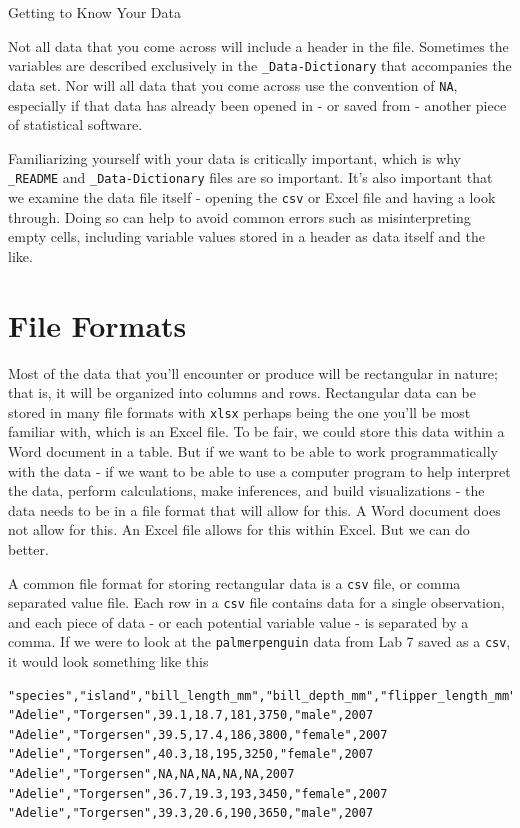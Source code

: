 \documentclass[
]{book}
\begin{document}
Getting to Know Your Data

Not all data that you come across will include a header in the file. Sometimes the variables are described exclusively in the \texttt{\_Data-Dictionary} that accompanies the data set. Nor will all data that you come across use the convention of \texttt{NA}, especially if that data has already been opened in - or saved from - another piece of statistical software.

Familiarizing yourself with your data is critically important, which is why \texttt{\_README} and \texttt{\_Data-Dictionary} files are so important. It's also important that we examine the data file itself - opening the \texttt{csv} or Excel file and having a look through. Doing so can help to avoid common errors such as misinterpreting empty cells, including variable values stored in a header as data itself and the like.

\hypertarget{file-formats}{%
\section*{File Formats}\label{file-formats}}

Most of the data that you'll encounter or produce will be rectangular in nature; that is, it will be organized into columns and rows. Rectangular data can be stored in many file formats with \texttt{xlsx} perhaps being the one you'll be most familiar with, which is an Excel file. To be fair, we could store this data within a Word document in a table. But if we want to be able to work programmatically with the data - if we want to be able to use a computer program to help interpret the data, perform calculations, make inferences, and build visualizations - the data needs to be in a file format that will allow for this. A Word document does not allow for this. An Excel file allows for this within Excel. But we can do better.

A common file format for storing rectangular data is a \texttt{csv} file, or comma separated value file. Each row in a \texttt{csv} file contains data for a single observation, and each piece of data - or each potential variable value - is separated by a comma. If we were to look at the \texttt{palmerpenguin} data from Lab 7 saved as a \texttt{csv}, it would look something like this

\begin{verbatim}
"species","island","bill_length_mm","bill_depth_mm","flipper_length_mm","body_mass_g","sex","year"
"Adelie","Torgersen",39.1,18.7,181,3750,"male",2007
"Adelie","Torgersen",39.5,17.4,186,3800,"female",2007
"Adelie","Torgersen",40.3,18,195,3250,"female",2007
"Adelie","Torgersen",NA,NA,NA,NA,NA,2007
"Adelie","Torgersen",36.7,19.3,193,3450,"female",2007
"Adelie","Torgersen",39.3,20.6,190,3650,"male",2007
\end{verbatim}
\end{document}

